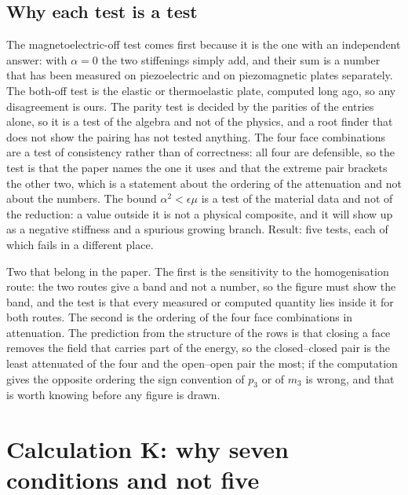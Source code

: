 \documentclass[11pt]{article}
\makeatletter
\newif\ifshowworked
\newenvironment{worked}{%
  \ifshowworked\par\smallskip\noindent\textit{Working.}\par\smallskip\else
  \setbox\z@\vbox\bgroup\fi}{\ifshowworked\par\smallskip\else\egroup\fi}
\makeatother
\begin{document}
\subsection*{Why each test is a test}

\begin{worked}
The magnetoelectric-off test comes first because it is the one with an independent answer: with
$\alpha=0$ the two stiffenings simply add, and their sum is a number that has been measured on
piezoelectric and on piezomagnetic plates separately. The both-off test is the elastic or thermoelastic
plate, computed long ago, so any disagreement is ours. The parity test is decided by the parities of the
entries alone, so it is a test of the algebra and not of the physics, and a root finder that does not show
the pairing has not tested anything. The four face combinations are a test of consistency rather than of
correctness: all four are defensible, so the test is that the paper names the one it uses and that the
extreme pair brackets the other two, which is a statement about the ordering of the attenuation and not
about the numbers.
The bound $\alpha^2<\epsilon\mu$ is a test of the material data and not of the reduction: a value outside
it is not a physical composite, and it will show up as a negative stiffness and a spurious growing branch.
Result: five tests, each of which fails in a different place.
\end{worked}

\begin{worked}
Two that belong in the paper. The first is the sensitivity to the homogenisation route: the two routes
give a band and not a number, so the figure must show the band, and the test is that every measured or
computed quantity lies inside it for both routes. The second is the ordering of the four face combinations
in attenuation. The prediction from the structure of the rows is that closing a face removes the field
that carries part of the energy, so the closed--closed pair is the least attenuated of the four and the
open--open pair the most; if the computation gives the opposite ordering the sign convention of $p_3$ or
of $m_3$ is wrong, and that is worth knowing before any figure is drawn.
\end{worked}

\section{Calculation K: why seven conditions and not five}
\end{document}
